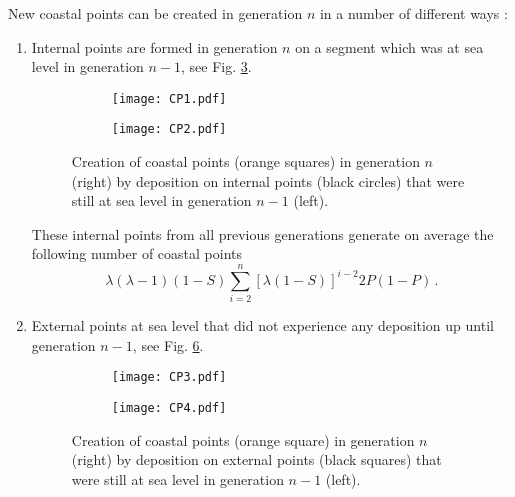 \documentclass[amsmath,amssymb,amsfonts,aps,pre,preprint,superscriptaddress,bibnotes,showpacs,showkeys,longbibliography,nofootinbib]{revtex4-1}
\begin{document}
New coastal points can be created in generation $n$ in a number of different ways \cite{MscBervoets,PhdGiuraniuc}:
\begin{enumerate}
    \item Internal points are formed in generation $n$ on a segment which was at sea level in generation $n-1$, see Fig. \ref{fig:CP12}. 
    \begin{figure}
        \centering
            \begin{subfigure}[b]{0.4\textwidth}
                 \centering
                 \texttt{[image: CP1.pdf]}
                 \label{fig:CP1}
            \end{subfigure}\hspace{2cm}
            \begin{subfigure}[b]{0.4\textwidth}
                 \centering
                 \texttt{[image: CP2.pdf]}
                 \label{fig:CP2}
            \end{subfigure}
            \caption{Creation of coastal points (orange squares) in generation $n$ (right) by deposition on internal points (black circles) that were still at sea level in generation $n-1$ (left). }
            \label{fig:CP12}
    \end{figure}
    These internal points from all previous generations generate on average the following number of coastal points
    \begin{equation}
        \label{eq:coastal_A}
        \lambda(\lambda-1)(1-S) \sum\limits_{i=2}^n \left[\lambda (1-S)\right]^{i-2} 2P (1-P)\, .
    \end{equation}
    \item External points at sea level that did not experience any deposition up until generation $n-1$, see Fig. \ref{fig:CP34}. 
    \begin{figure}[h]
        \centering
            \begin{subfigure}[b]{0.4\textwidth}
                 \centering
                 \texttt{[image: CP3.pdf]}
                 \label{fig:CP3}
            \end{subfigure}\hspace{2cm}
            \begin{subfigure}[b]{0.4\textwidth}
                 \centering
                 \texttt{[image: CP4.pdf]}
                 \label{fig:CP4}
            \end{subfigure}
            \caption{Creation of coastal points (orange square) in generation $n$ (right) by deposition on external points (black squares) that were still at sea level in generation $n-1$ (left). }
            \label{fig:CP34}
    \end{figure}
    

\end{enumerate}
\end{document}
